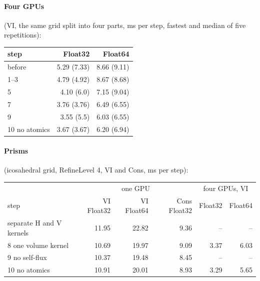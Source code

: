 \documentclass[11pt,a4paper]{article}
\begin{document}
\paragraph{Four GPUs} (VI, the same grid split into four parts, ms per
step, fastest and median of five repetitions):
\begin{center}
\small
\begin{tabular}{lrr}
\toprule
step & Float32 & Float64 \\
\midrule
before       & 5.29 (7.33) & 8.66 (9.11) \\
1--3         & 4.79 (4.92) & 8.67 (8.68) \\
5            & 4.10 (6.0)  & 7.15 (9.04) \\
7            & 3.76 (3.76) & 6.49 (6.55) \\
9            & 3.55 (5.5)  & 6.03 (6.55) \\
10 no atomics & 3.67 (3.67) & 6.20 (6.94) \\
\bottomrule
\end{tabular}
\end{center}

\paragraph{Prisms} (icosahedral grid, RefineLevel 4, VI and Cons,
ms per step):
\begin{center}
\small
\begin{tabular}{lrrrrr}
\toprule
 & \multicolumn{3}{c}{one GPU} & \multicolumn{2}{c}{four GPUs, VI} \\
step & VI Float32 & VI Float64 & Cons Float32 & Float32 & Float64 \\
\midrule
separate H and V kernels & 11.95 & 22.82 & 9.36 & -- & -- \\
8 one volume kernel      & 10.69 & 19.97 & 9.09 & 3.37 & 6.03 \\
9 no self-flux           & 10.37 & 19.48 & 8.45 & -- & -- \\
10 no atomics            & 10.91 & 20.01 & 8.93 & 3.29 & 5.65 \\
\bottomrule
\end{tabular}
\end{center}
\end{document}
